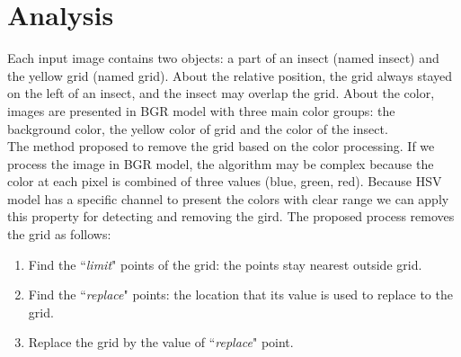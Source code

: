 \section{Analysis}
Each input image contains two objects: a part of an insect (named insect) and the yellow grid (named grid). About the relative position, the grid always stayed on the left of an insect, and the insect may overlap the grid. About the color, images are presented in BGR model with three main color groups: the background color, the yellow color of grid and the color of the insect.\\[0.2cm]
The method proposed to remove the grid based on the color processing. If we process the image in BGR model, the algorithm may be complex because the color at each pixel is combined of three values (blue, green, red). Because HSV model has a specific channel to present the colors with clear range we can apply this property for detecting and removing the gird. The proposed process removes the grid as follows:
\begin{enumerate}
\item Find the ``\textit{limit}" points of the grid: the points stay nearest outside grid.
\item Find the ``\textit{replace}" points:  the location that its value is used to replace to the grid.
\item Replace the grid by the value of ``\textit{replace}" point.
\end{enumerate}
